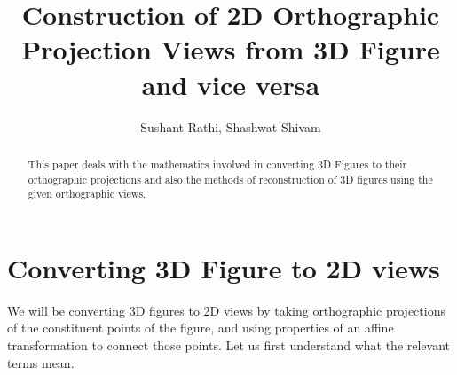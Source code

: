 \documentclass[12pt,a4paper]{article}
\title{Construction of 2D Orthographic Projection Views from 3D Figure and vice versa}
\author{Sushant Rathi, Shashwat Shivam}
\begin{document}
\maketitle

\begin{abstract}
This paper deals with the mathematics involved in converting 3D Figures to their orthographic projections and also the methods of reconstruction of 3D figures using the given orthographic views.
\end{abstract}

\tableofcontents

\newpage




\section{Converting 3D Figure to 2D views}

We will be converting 3D figures to 2D views by taking orthographic projections of the constituent points of the figure, and using properties of an affine transformation to connect those points. Let us first understand what the relevant terms mean.
\\ \\
\end{document}
